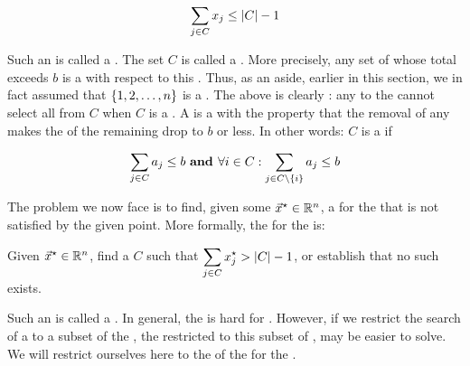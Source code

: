 \begin{equation}
\sumdomain[j]{C}{x_j}\leq\abs{C}-1
\end{equation}

Such an  is called a . The set $C$ is called a . More precisely, any set of  whose total  exceeds $b$ is a  with respect to this . Thus, as an aside, earlier in this section, we in fact assumed that $\accl{1,2,\ldots,n}$ is a . The  above is clearly : any  to the  cannot select all  from $C$ when $C$ is a . A  is a  with the property that the removal of any  makes the  of the remaining  drop to $b$ or less. In other words: $C$ is a  if

\begin{equation}
\sumdomain[j]{C}{a_j}\leq b\xand\forall i\in C:\sumdomain[j]{C\setminus\accl{i}}{a_j}\leq b
\end{equation}

The problem we now face is to find, given some  $\vec{x}^{\star}\in\RRR^n$, a  for the  that is not satisfied by the given point. More formally, the  for the  is:

\begin{definition}
Given $\vec{x}^{\star}\in\RRR^n$, find a  $C$ such that $\sumdomain[j]{C}{x_j^{\star}}>\abs{C}-1$, or establish that no such  exists.
\end{definition}

Such an  is called a . In general, the  is hard for . However, if we restrict the search of a  to a subset of the , the  restricted to this subset of , may be easier to solve. We will restrict ourselves here to the  of the  for the .

